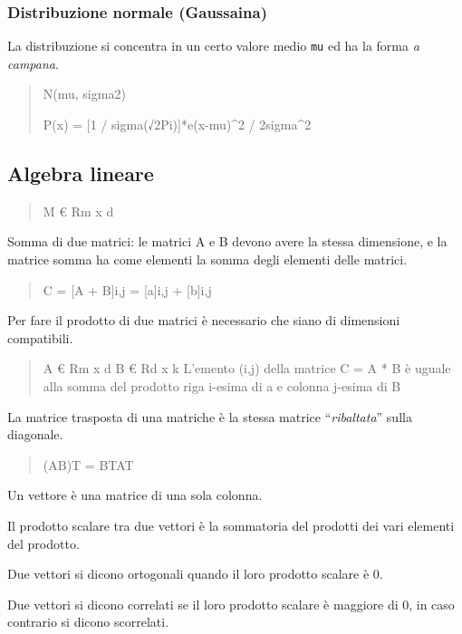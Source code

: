 \subsubsection{Distribuzione normale
(Gaussaina)}\label{distribuzione-normale-gaussaina}

La distribuzione si concentra in un certo valore medio \texttt{mu} ed ha
la forma \emph{a campana}.

\begin{quote}
N(mu, sigma2)

P(x) = {[}1 / sigma(√2Pi){]}*e(x-mu)\^{}2 / 2sigma\^{}2
\end{quote}

\subsection{Algebra lineare}\label{algebra-lineare}

\begin{quote}
M \euro{} Rm x d
\end{quote}

Somma di due matrici: le matrici A e B devono avere la stessa
dimensione, e la matrice somma ha come elementi la somma degli elementi
delle matrici.

\begin{quote}
C = {[}A + B{]}i,j = {[}a{]}i,j + {[}b{]}i,j
\end{quote}

Per fare il prodotto di due matrici è necessario che siano di dimensioni
compatibili.

\begin{quote}
A \euro{} Rm x d B \euro{} Rd x k L'emento (i,j) della matrice C = A * B
è uguale alla somma del prodotto riga i-esima di a e colonna j-esima di
B
\end{quote}

La matrice trasposta di una matriche è la stessa matrice
``\emph{ribaltata}'' sulla diagonale.

\begin{quote}
(AB)T = BTAT
\end{quote}

Un vettore è una matrice di una sola colonna.

Il prodotto scalare tra due vettori è la sommatoria del prodotti dei
vari elementi del prodotto.

Due vettori si dicono ortogonali quando il loro prodotto scalare è 0.

Due vettori si dicono correlati se il loro prodotto scalare è maggiore
di 0, in caso contrario si dicono scorrelati.

